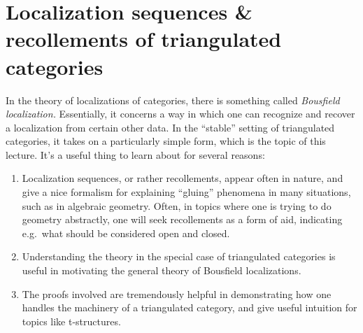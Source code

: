 
\section{Localization sequences \& recollements of triangulated categories}\label{lecture:localization-sequences-of-triangulated-categories}
In the theory of localizations of categories, there is something called \emph{Bousfield localization.} Essentially, it concerns a way in which one can recognize and recover a localization from
certain other data. In the ``stable'' setting of triangulated categories, it takes on a particularly simple form, which is the topic of this lecture. It's a useful thing to learn about
for several reasons:
\begin{enumerate}[label=(\arabic*)]
\item Localization sequences, or rather recollements, appear often in nature, and give a nice formalism for explaining ``gluing'' phenomena in many situations, such as in algebraic geometry.
Often, in topics where one is trying to do geometry abstractly, one will seek recollements as a form of aid, indicating e.g.\ what should be considered open and closed.
\item Understanding the theory in the special case of triangulated categories is useful in motivating the general theory of Bousfield localizations.
\item The proofs involved are tremendously helpful in demonstrating how one handles the machinery of a triangulated category, and give useful intuition for topics like t-structures.
\end{enumerate}

